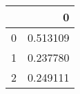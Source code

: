 \begin{tabular}{lr}
\toprule
 & 0 \\
\midrule
0 & 0.513109 \\
1 & 0.237780 \\
2 & 0.249111 \\
\bottomrule
\end{tabular}
